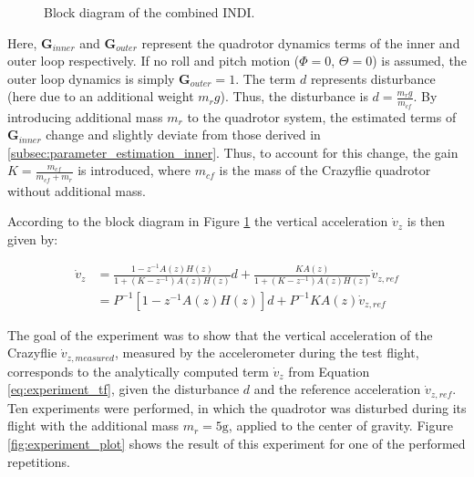 \documentclass[11pt, a4paper, twoside]{report}
\begin{document}
\begin{figure}[H]
	\centering 
	\captionsetup{justification=centering, singlelinecheck=off, font=bf, belowskip=-0.5cm}
	\caption[Block diagram of the combined \acrshort{INDI}]{Block diagram of the combined \acrshort{INDI}.}
	\label{fig:experiment_block_diag}
\end{figure}

Here, $\bm{G}_{inner}$ and $\bm{G}_{outer}$ represent the quadrotor dynamics terms of the inner and outer loop respectively. If no roll and pitch motion ($\Phi=0$, $\Theta=0$) is assumed, the outer loop dynamics is simply $\bm{G}_{outer} = 1$. The term $d$ represents disturbance (here due to an additional weight $m_r g$). Thus, the disturbance is $d=\frac{m_r g}{m_{cf}}$. By introducing additional mass $m_r$ to the quadrotor system, the estimated terms of $\bm{G}_{inner}$ change and slightly deviate from those derived in \ref{subsec:parameter_estimation_inner}. Thus, to account for this change, the gain $K = \frac{m_{cf}}{m_{cf} + m_r}$ is introduced, where $m_{cf}$ is the mass of the Crazyflie quadrotor without additional mass.  

According to the block diagram in Figure \ref{fig:experiment_block_diag} the vertical acceleration $\dot{v}_{z}$ is then given by: 

\begin{equation}
	\begin{split}
	\dot{v}_{z} &= \frac{1-z^{-1}A(z)H(z)}{1+(K-z^{-1})A(z)H(z)}d + \frac{KA(z)}{1+(K-z^{-1})A(z)H(z)} \dot{v}_{z,ref} \\
	&= P^{-1}[1-z^{-1}A(z)H(z)]d + P^{-1}KA(z)\dot{v}_{z,ref}
	\label{eq:experiment_tf}
	\end{split}
\end{equation}

The goal of the experiment was to show that the vertical acceleration of the Crazyflie $\dot{v}_{z,measured}$, measured by the accelerometer during the test flight, corresponds to the analytically computed term $\dot{v}_{z}$ from Equation \ref{eq:experiment_tf}, given the disturbance $d$ and the reference acceleration $\dot{v}_{z,ref}$. Ten experiments were performed, in which the quadrotor was disturbed during its flight with the additional mass $m_r=5\si{\g}$, applied to the center of gravity. Figure \ref{fig:experiment_plot} shows the result of this experiment for one of the performed repetitions. 
\end{document}
